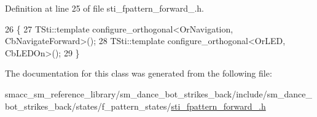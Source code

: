 Definition at line 25 of file sti\+\_\+fpattern\+\_\+forward\+\_.\+h.


\begin{DoxyCode}
26   \{
27     TSti::template configure\_orthogonal<OrNavigation, CbNavigateForward>();
28     TSti::template configure\_orthogonal<OrLED, CbLEDOn>();
29   \}
\end{DoxyCode}


The documentation for this class was generated from the following file\+:\begin{DoxyCompactItemize}
\item 
smacc\+\_\+sm\+\_\+reference\+\_\+library/sm\+\_\+dance\+\_\+bot\+\_\+strikes\+\_\+back/include/sm\+\_\+dance\+\_\+bot\+\_\+strikes\+\_\+back/states/f\+\_\+pattern\+\_\+states/\hyperlink{sm__dance__bot__strikes__back_2include_2sm__dance__bot__strikes__back_2states_2f__pattern__states_2sti__fpattern__forward__1_8h}{sti\+\_\+fpattern\+\_\+forward\+\_.\+h}\end{DoxyCompactItemize}
